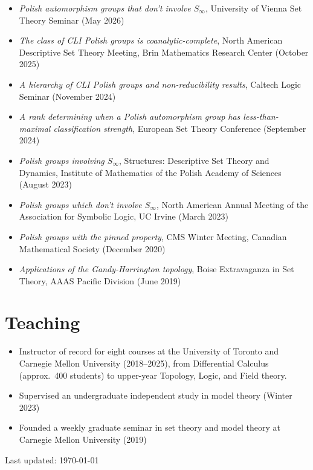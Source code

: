 \documentclass[letterpaper]{article}
\begin{document}
\begin{itemize}
  \item \emph{Polish automorphism groups that don't involve $S_\infty$},
        University of Vienna Set Theory Seminar (May 2026)
  \item \emph{The class of CLI Polish groups is coanalytic-complete}, North
        American Descriptive Set Theory Meeting, Brin Mathematics Research
        Center (October 2025)
  \item \emph{A hierarchy of CLI Polish groups and non-reducibility results},
        Caltech Logic Seminar (November 2024)
  \item \emph{A rank determining when a Polish automorphism group has
        less-than-maximal classification strength}, European Set Theory
        Conference (September 2024)
  \item \emph{Polish groups involving $S_\infty$}, Structures: Descriptive Set
        Theory and Dynamics, Institute of Mathematics of the Polish Academy of
        Sciences (August 2023)
  \item \emph{Polish groups which don't involve $S_\infty$}, North American
        Annual Meeting of the Association for Symbolic Logic, UC Irvine
        (March 2023)
  \item \emph{Polish groups with the pinned property}, CMS Winter Meeting,
        Canadian Mathematical Society (December 2020)
  \item \emph{Applications of the Gandy-Harrington topology}, Boise
        Extravaganza in Set Theory, AAAS Pacific Division (June 2019)
\end{itemize}

\section*{Teaching}

\begin{itemize}
  \item Instructor of record for eight courses at the University of Toronto and
        Carnegie Mellon University (2018--2025), from Differential Calculus
        (approx.\ 400 students) to upper-year Topology, Logic, and Field theory.
  \item Supervised an undergraduate independent study in model theory
        (Winter 2023)
  \item Founded a weekly graduate seminar in set theory and model theory at
        Carnegie Mellon University (2019)
\end{itemize}

\bigskip

\begin{center}
  \begin{footnotesize}
    Last updated: \today
  \end{footnotesize}
\end{center}
\end{document}
